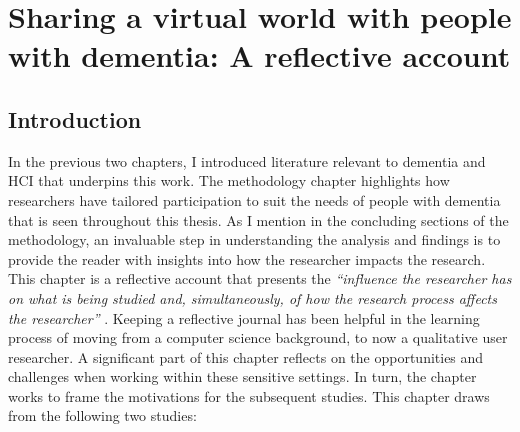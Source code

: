 \chapter{Sharing a virtual world with people with dementia: A reflective account}
\label{NegotatingReseacherParticipantRelationships}

\section{Introduction}
\label{CH4:Intro}
In the previous two chapters, I introduced literature relevant to dementia and HCI that underpins this work. The methodology chapter highlights how researchers have tailored participation to suit the needs of people with dementia that is seen throughout this thesis. As I mention in the concluding sections of the methodology, an invaluable step in understanding the analysis and findings is to provide the reader with insights into how the researcher impacts the research. This chapter is a reflective account that presents the \textit{``influence the researcher has on what is being studied and, simultaneously, of how the research process affects the researcher''} \citep{probst2014double}. Keeping a reflective journal has been helpful in the learning process of moving from a computer science background, to now a qualitative user researcher. A significant part of this chapter reflects on the opportunities and challenges when working within these sensitive settings. In turn, the chapter works to frame the motivations for the subsequent studies. This chapter draws from the following two studies: 

